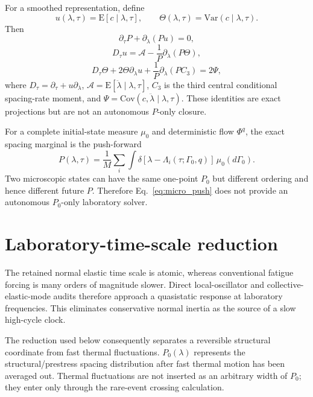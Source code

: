 \documentclass[11pt]{article}
\newcommand{\Eop}{\mathrm{E}}
\newcommand{\Var}{\mathrm{Var}}
\newcommand{\Cov}{\mathrm{Cov}}
\begin{document}
For a smoothed representation, define
\begin{equation}
u(\lambda,\tau)=\Eop[c\mid\lambda,\tau],
\qquad
\Theta(\lambda,\tau)=\Var(c\mid\lambda,\tau).
\end{equation}
Then
\begin{equation}
\partial_\tau P+\partial_\lambda(Pu)=0,
\end{equation}
\begin{equation}
D_\tau u=\mathcal A-\frac1P\partial_\lambda(P\Theta),
\end{equation}
\begin{equation}
D_\tau\Theta+2\Theta\partial_\lambda u
+\frac1P\partial_\lambda(PC_3)=2\Psi,
\label{eq:theta}
\end{equation}
where $D_\tau=\partial_\tau+u\partial_\lambda$, $\mathcal A=\Eop[\ddot\lambda\mid\lambda,\tau]$, $C_3$ is the third central conditional spacing-rate moment, and $\Psi=\Cov(c,\ddot\lambda\mid\lambda,\tau)$. These identities are exact projections but are not an autonomous $P$-only closure.

For a complete initial-state measure $\mu_0$ and deterministic flow $\Phi^q$, the exact spacing marginal is the push-forward
\begin{equation}
P(\lambda,\tau)
=\frac1M\sum_i\int
\delta[\lambda-\Lambda_i(\tau;\Gamma_0,q)]\,\mu_0(d\Gamma_0).
\label{eq:micro_push}
\end{equation}
Two microscopic states can have the same one-point $P_0$ but different ordering and hence different future $P$. Therefore Eq.~\eqref{eq:micro_push} does not provide an autonomous $P_0$-only laboratory solver.

\section{Laboratory-time-scale reduction}
The retained normal elastic time scale is atomic, whereas conventional fatigue forcing is many orders of magnitude slower. Direct local-oscillator and collective-elastic-mode audits therefore approach a quasistatic response at laboratory frequencies. This eliminates conservative normal inertia as the source of a slow high-cycle clock.

The reduction used below consequently separates a reversible structural coordinate from fast thermal fluctuations. $P_0(\lambda)$ represents the structural/prestress spacing distribution after fast thermal motion has been averaged out. Thermal fluctuations are not inserted as an arbitrary width of $P_0$; they enter only through the rare-event crossing calculation.
\end{document}
